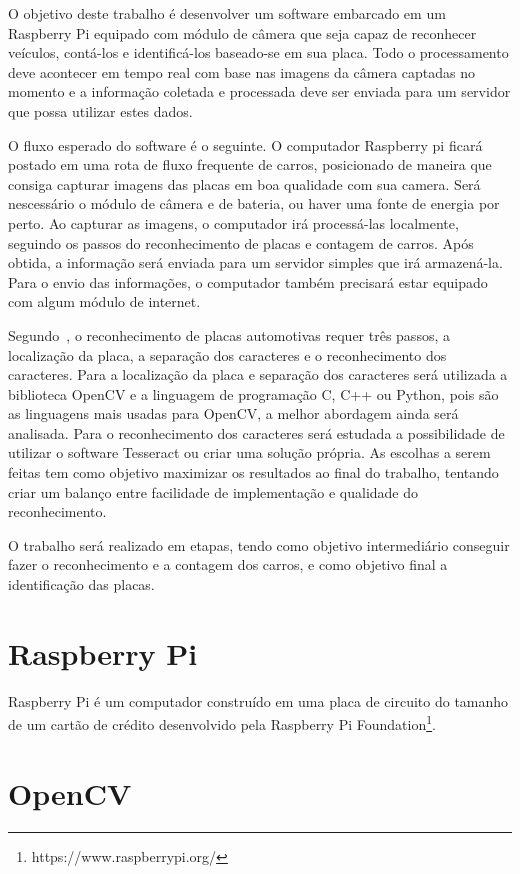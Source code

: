 
O objetivo deste trabalho é desenvolver um software embarcado em um Raspberry Pi
equipado com módulo de câmera que seja capaz de reconhecer veículos, contá-los e
identificá-los baseado-se em sua placa. Todo o processamento deve acontecer em
tempo real com base nas imagens da câmera captadas no momento e a informação
coletada e processada deve ser enviada para um servidor que possa utilizar estes
dados.

O fluxo esperado do software é o seguinte. O computador Raspberry pi ficará postado
em uma rota de fluxo frequente de carros, posicionado de maneira que consiga capturar
imagens das placas em boa qualidade com sua camera. Será nescessário o módulo de câmera
e de bateria, ou haver uma fonte de energia por perto. Ao capturar as imagens, o computador
irá processá-las localmente, seguindo os passos do reconhecimento de placas e contagem de carros.
Após obtida, a informação será enviada para um servidor simples que irá armazená-la. Para o envio
das informações, o computador também precisará estar equipado com algum módulo de internet.

Segundo~\cite{ahmad2015automatic}, o reconhecimento de placas automotivas requer
três passos, a localização da placa, a separação dos caracteres e o
reconhecimento dos caracteres. Para a localização da placa e separação dos
caracteres será utilizada a biblioteca OpenCV e a linguagem de programação C,
C++ ou Python, pois são as linguagens mais usadas para OpenCV, a melhor
abordagem ainda será analisada. Para o reconhecimento dos caracteres será
estudada a possibilidade de utilizar o software Tesseract ou criar uma solução
própria. As escolhas a serem feitas tem como objetivo maximizar os resultados ao
final do trabalho, tentando criar um balanço entre facilidade de implementação e
qualidade do reconhecimento.

O trabalho será realizado em etapas, tendo como objetivo intermediário conseguir
fazer o reconhecimento e a contagem dos carros, e como objetivo final a
identificação das placas.

\section{Raspberry Pi}
\label{sec:raspi}

Raspberry Pi é um computador construído em uma placa de circuito do tamanho de
um cartão de crédito desenvolvido pela Raspberry Pi
Foundation\footnote{https://www.raspberrypi.org/}.

\section{OpenCV}
\label{sec:opencv}

